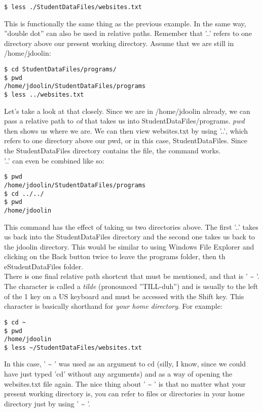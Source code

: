 \begin{verbatim}
$ less ./StudentDataFiles/websites.txt
\end{verbatim}

This is functionally the same thing as the previous example.  In the same way, ''double dot'' can also be used in relative paths.  Remember that '..' refers to one directory above our present working directory.  Assume that we are still in /home/jdoolin:

\begin{verbatim}
$ cd StudentDataFiles/programs/
$ pwd
/home/jdoolin/StudentDataFiles/programs
$ less ../websites.txt
\end{verbatim}

Let's take a look at that closely.  Since we are in /home/jdoolin already, we can pass a relative path to \textit{cd} that takes us into StudentDataFiles/programs.  \textit{pwd} then shows us where we are.  We can then view websites.txt by using '..', which refers to one directory above our pwd, or in this case, StudentDataFiles.  Since the StudentDataFiles directory contains the file, the command works.\\

'..' can even be combined like so:

\begin{verbatim}
$ pwd
/home/jdoolin/StudentDataFiles/programs
$ cd ../../
$ pwd
/home/jdoolin
\end{verbatim}

This command has the effect of taking us two directories above.  The first '..' takes us back into the StudentDataFiles directory and the second one takes us back to the jdoolin directory.  This would be similar to using Windows File Explorer and clicking on the Back button twice to leave the programs folder, then th eStudentDataFiles folder.\\

There is one final relative path shortcut that must be mentioned, and that is ' {\textasciitilde} '.  The character is called a \textit{tilde} (pronounced ''TILL-duh'') and is usually to the left of the 1 key on a US keyboard and must be accessed with the Shift key.  This character is basically shorthand for \textit{your home directory}.  For example:

\begin{verbatim}
$ cd ~
$ pwd
/home/jdoolin
$ less ~/StudentDataFiles/websites.txt
\end{verbatim}

In this case, ' {\textasciitilde} ' was used as an argument to cd (silly, I know, since we could have just typed 'cd' without any arguments) and as a way of opening the websites.txt file again.  The nice thing about ' {\textasciitilde} ' is that no matter what your present working directory is, you can refer to files or directories in your home directory just by using ' {\textasciitilde} '.

